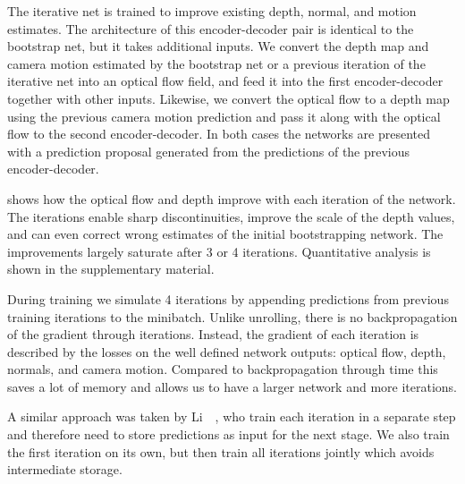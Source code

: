 \documentclass[10pt,twocolumn,letterpaper]{article}
\begin{document}
The iterative net is trained to improve existing depth, normal, and motion estimates.
The architecture of this encoder-decoder pair is identical to the bootstrap net, but it takes additional inputs. 
We convert the depth map and camera motion estimated by the bootstrap net or a previous iteration of the iterative net into an optical flow field, and feed it into the first encoder-decoder together with other inputs.
Likewise, we convert the optical flow to a depth map using the previous camera motion prediction and pass it along with the optical flow to the second encoder-decoder.
In both cases the networks are presented with a prediction proposal generated from the predictions of the previous encoder-decoder.

 shows how the optical flow and depth improve with each iteration of the network. 
The iterations enable sharp discontinuities, improve the scale of the depth values, and can even correct wrong estimates of the initial bootstrapping network.
The improvements largely saturate after 3 or 4 iterations.
Quantitative analysis is shown in the supplementary material.

During training we simulate 4 iterations by appending predictions from previous training iterations to the minibatch.
Unlike unrolling, there is no backpropagation of the gradient through iterations.
Instead, the gradient of each iteration is described by the losses on the well defined network outputs:  optical flow, depth, normals, and camera motion.
Compared to backpropagation through time this saves a lot of memory and allows us to have a larger network and more iterations. 
\begin{NEW}
A similar approach was taken by Li~\etal~\cite{li_iterative_2016}, who train each iteration in a separate step and therefore need to store predictions as input for the next stage.
We also train the first iteration on its own, but then train all iterations jointly which avoids intermediate storage.
\end{NEW}
\end{document}
